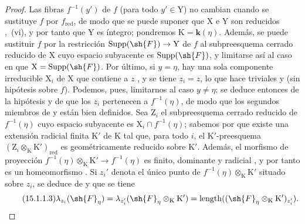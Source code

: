 \begin{proof}
\label{IV.15.1.1-proof}
Las fibras $f^{-1}(y')$ de $f$ (para todo $y'\in\mathrm{Y}$) no cambian cuando se sustituye $f$ por $f_\mathrm{red}$, de modo que se puede suponer que $\mathrm{X}$ e $\mathrm{Y}$ son reducidos ,~(vi), y por tanto que $\mathrm{Y}$ es íntegro; pondremos $\mathrm{K}=\boldsymbol{k}(\eta)$.
Además, se puede sustituir $f$ por la restricción $\operatorname{Supp}(\sh{F})\to\mathrm{Y}$ de $f$ al subpreesquema cerrado reducido de $\mathrm{X}$ cuyo espacio subyacente es $\operatorname{Supp}(\sh{F})$, y limitarse así al caso en que $\mathrm{X}=\operatorname{Supp}(\sh{F})$.
Por último, si $y=\eta$, hay una sola componente irreducible $\mathrm{X}_i$ de $\mathrm{X}$ que contiene a $z$ , y se tiene $z_i=z$, lo que hace triviales  y  (sin hipótesis sobre $f$).
Podemos, pues, limitarnos al caso $y\neq\eta$; se deduce entonces de la hipótesis y de  que los $z_i$ pertenecen a $f^{-1}(\eta)$, de modo que los segundos miembros de  y  están bien definidos.
Sea $\mathrm{Z}_i$ el subpreesquema cerrado reducido de $f^{-1}(\eta)$ cuyo espacio subyacente es $\mathrm{X}_i\cap f^{-1}(\eta)$; sabemos por  que existe una extensión radicial finita $\mathrm{K}'$ de $\mathrm{K}$ tal que, para todo $i$, el $\mathrm{K}'$-preesquema $(\mathrm{Z}_i\otimes_\mathrm{K}\mathrm{K}')_\mathrm{red}$ es geométricamente reducido sobre $\mathrm{K}'$.
Además, el morfismo de proyección $f^{-1}(\eta)\otimes_\mathrm{K}\mathrm{K}'\to f^{-1}(\eta)$ es finito, dominante y radicial , y por tanto es un homeomorfismo .
Si $z_i'$ denota el único punto de $f^{-1}(\eta)\otimes_\mathrm{K}\mathrm{K}'$ situado sobre $z_i$, se deduce de  y  que se tiene
\[
\tag{15.1.1.3}
\label{IV.15.1.1.3}
  \lambda_{z_i}(\sh{F}_\eta)=\lambda_{z_i'}(\sh{F}_\eta\otimes_\mathrm{K}\mathrm{K}')=\operatorname{length}((\sh{F}_\eta\otimes_\mathrm{K}\mathrm{K}')_{z_i'}).
\]


\end{proof}
